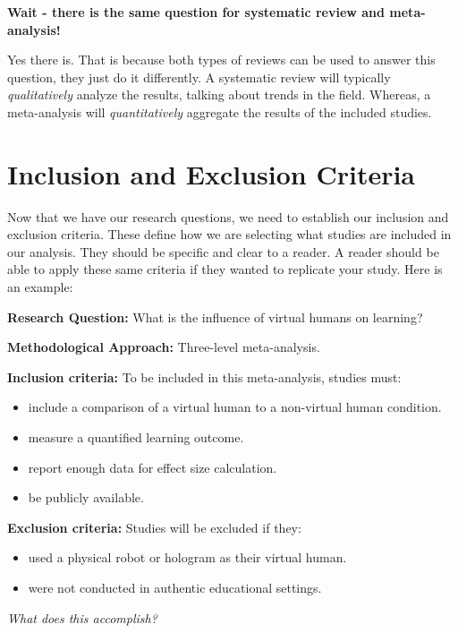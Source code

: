 \documentclass[
]{book}
\begin{document}
\textbf{Wait - there is the same question for systematic review and meta-analysis!}

Yes there is. That is because both types of reviews can be used to answer this question, they just do it differently. A systematic review will typically \emph{qualitatively} analyze the results, talking about trends in the field. Whereas, a meta-analysis will \emph{quantitatively} aggregate the results of the included studies.

\hypertarget{inclusion-and-exclusion-criteria}{%
\section{Inclusion and Exclusion Criteria}\label{inclusion-and-exclusion-criteria}}

Now that we have our research questions, we need to establish our inclusion and exclusion criteria. These define how we are selecting what studies are included in our analysis. They should be specific and clear to a reader. A reader should be able to apply these same criteria if they wanted to replicate your study. Here is an example:

\textbf{Research Question:} What is the influence of virtual humans on learning?

\textbf{Methodological Approach:} Three-level meta-analysis.

\textbf{Inclusion criteria:} To be included in this meta-analysis, studies must:

\begin{itemize}
\item
  include a comparison of a virtual human to a non-virtual human condition.
\item
  measure a quantified learning outcome.
\item
  report enough data for effect size calculation.
\item
  be publicly available.
\end{itemize}

\textbf{Exclusion criteria:} Studies will be excluded if they:

\begin{itemize}
\item
  used a physical robot or hologram as their virtual human.
\item
  were not conducted in authentic educational settings.
\end{itemize}

\emph{What does this accomplish?}
\end{document}
